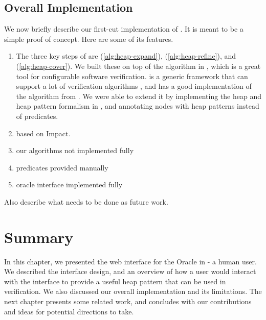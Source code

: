 \subsection{Overall Implementation}
We now briefly describe our first-cut implementation of \verifier. It is meant to be
a simple proof of concept. Here are some of its features.

\begin{enumerate}
  \item The three key steps of \verifier are \expandp (\autoref{alg:heap-expand}),  (\autoref{alg:heap-refine}), and \coverp (\autoref{alg:heap-cover}). We built these on top of the \impact algorithm in \cpachecker, which is a great tool for configurable software verification. \cpachecker is a generic framework that can support a lot of verification algorithms \cite{cpachecker}, and has a good implementation of the \impact algorithm from \cite{mcmillan06}. We were able to extend it by implementing the heap and heap pattern formalism in \cpachecker, and annotating nodes with heap patterns instead of predicates.
  \item \expand {} \cover based on \cpachecker \cite{cpachecker} Impact.
  \item our algorithms not implemented fully
  \item predicates provided manually
  \item oracle interface implemented fully
\end{enumerate}

Also describe what needs to be done as future work.

\section*{Summary}
In this chapter, we presented the web interface for the Oracle in \verifier - a human
user. We described the interface design, and an overview of how a user would interact
with the interface to provide a useful heap pattern that can be used in verification. We
also discussed our overall implementation and its limitations. The next chapter presents
some related work, and concludes with  our contributions and ideas for potential
directions to take.
